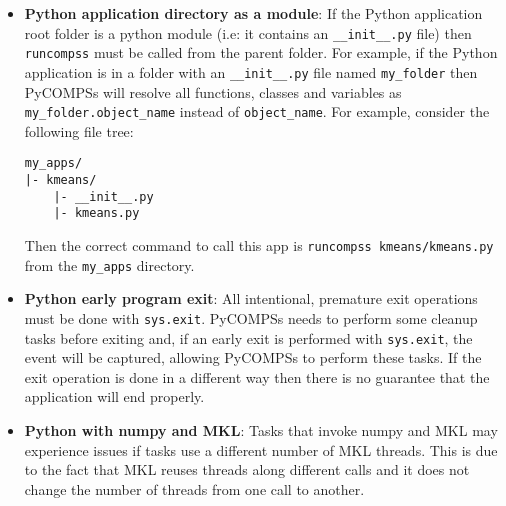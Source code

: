 \begin{itemize}
\item \textbf{Python application directory as a module}:\newline
If the Python application root folder is a python module (i.e: it contains an \verb|__init__.py| file) then \verb|runcompss| must be called from
the parent folder. For example, if the Python application is in a folder with an \verb|__init__.py| file named \verb|my_folder| then PyCOMPSs will
resolve all functions, classes and variables as \verb|my_folder.object_name| instead of \verb|object_name|. For example, consider the following file
tree:
\begin{lstlisting}[]
my_apps/
|- kmeans/
    |- __init__.py
    |- kmeans.py
\end{lstlisting}
Then the correct command to call this app is \verb|runcompss kmeans/kmeans.py| from the \verb|my_apps| directory.

\item \textbf{Python early program exit}:\newline
All intentional, premature exit operations must be done with \verb|sys.exit|. PyCOMPSs needs to perform some cleanup tasks before exiting and, if an early exit is performed with \verb|sys.exit|, the event will be captured,
allowing PyCOMPSs to perform these tasks. If the exit operation is done in a different way then there is no guarantee that the application will end properly.

\item \textbf{Python with numpy and MKL}:\newline
Tasks that invoke numpy and MKL may experience issues if tasks use a different number of MKL threads. This is due to the fact that MKL reuses 
threads along different calls and it does not change the number of threads from one call to another.


\end{itemize}

